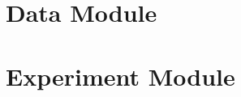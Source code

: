 \documentclass[../../fyp.tex]{subfiles}
\begin{document}
\section{Data Module}


\section{Experiment Module} \label{sec:experiment_module}


\end{document}
